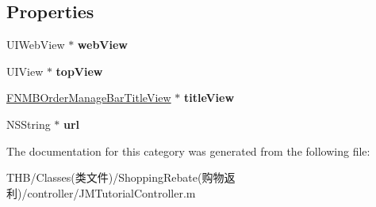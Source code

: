 \subsection*{Properties}
\begin{DoxyCompactItemize}
\item 
\mbox{\label{category_j_m_tutorial_controller_07_08_a6996af4e744dcc3dc18fc69729732b26}} 
U\+I\+Web\+View $\ast$ {\bfseries web\+View}
\item 
\mbox{\label{category_j_m_tutorial_controller_07_08_acde971e5fbf15f5bf21461a22baa6157}} 
U\+I\+View $\ast$ {\bfseries top\+View}
\item 
\mbox{\label{category_j_m_tutorial_controller_07_08_adbcb950008567d089d7d6a45434c9524}} 
\mbox{\hyperlink{interface_f_n_m_b_order_manage_bar_title_view}{F\+N\+M\+B\+Order\+Manage\+Bar\+Title\+View}} $\ast$ {\bfseries title\+View}
\item 
\mbox{\label{category_j_m_tutorial_controller_07_08_a406045d086c3ca5ea0f909d9cb2dbb48}} 
N\+S\+String $\ast$ {\bfseries url}
\end{DoxyCompactItemize}


The documentation for this category was generated from the following file\+:\begin{DoxyCompactItemize}
\item 
T\+H\+B/\+Classes(类文件)/\+Shopping\+Rebate(购物返利)/controller/J\+M\+Tutorial\+Controller.\+m\end{DoxyCompactItemize}

